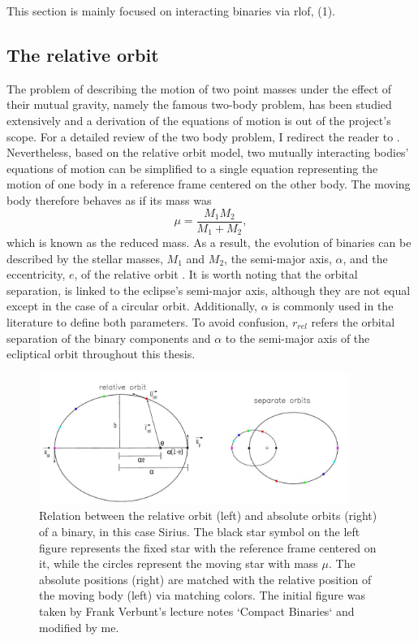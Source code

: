 This section is mainly focused on interacting binaries via \ac{rlof}, (1). 

\subsection{The relative orbit}

The problem of describing the motion of two point masses
under the effect of their mutual gravity, namely the famous two-body problem, has been studied extensively and a derivation of the equations of motion is out of the project's scope. For a detailed review of the two body problem, I redirect the reader to  \cite{postnov2014evolution}. Nevertheless, based on the relative orbit model, two mutually interacting bodies' equations of motion can be simplified to a single equation representing the motion of one body in a reference frame centered on the other body. The moving body therefore behaves as if its mass was
\begin{equation}\label{eq:reduced_mass}
    \mu= \frac{M_1 M_2}{M_1 + M_2},
\end{equation}
which is known as the reduced mass. As a result, the evolution of binaries can be described by the stellar masses, $M_1$ and $M_2$, the semi-major axis, $\alpha$, and the eccentricity, $e$, of the relative orbit \citep{sana2012binary,postnov2014evolution,toonen2014popcorn}. It is worth noting that the orbital separation, is linked to the eclipse's semi-major axis, although they are not equal except in the case of a circular orbit. Additionally, $\alpha$ is commonly used in the literature to define both parameters. To avoid confusion, $r_{rel}$ refers the orbital separation of the binary components and $\alpha$ to the semi-major axis of the ecliptical orbit throughout this thesis.
\begin{figure}[H]
    \centering
    \includegraphics[width=0.9\textwidth]{Thesis/figures/relative_orbit.pdf}
    \caption{Relation between the relative orbit (left) and absolute orbits (right) of a
    binary, in this case Sirius. The black star symbol on the left figure represents the fixed star with the reference frame centered on it, while the circles represent the moving star with mass $\mu$. The absolute positions (right) are matched with the relative position of the moving body (left) via matching colors.   The initial figure was taken by Frank Verbunt's lecture notes `Compact Binaries` and modified by me.}
    \label{fig:relative_orbit}
\end{figure}


